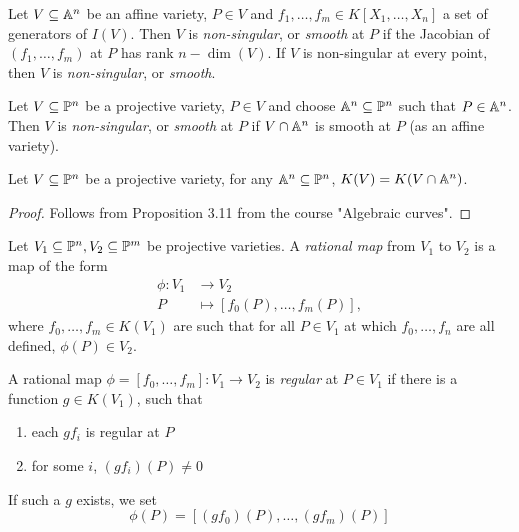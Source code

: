 \begin{definition}
	Let $V \subseteq \mathbb{A}^n$ be an affine variety, $P \in V$ and 
	$f_1, \dots, f_m \in K[X_1, \dots, X_n]$ a set of generators of $I(V)$.
	Then $V$ is \emph{non-singular}, or \emph{smooth} at $P$ if the Jacobian
	of $(f_1, \dots, f_m)$ at $P$ has rank $n - \dim(V)$.
	If $V$ is non-singular at every point, then $V$ is \emph{non-singular},
	or \emph{smooth}.
\end{definition}

\begin{definition}
	Let $V \subseteq \mathbb{P}^n$ be a projective variety,
	$P \in V$ and choose $\mathbb{A}^n \subseteq \mathbb{P}^n$ such
	that $P \in \mathbb{A}^n$. Then $V$ is \emph{non-singular}, or \emph{smooth}
	at $P$ if $V \cap \mathbb{A}^n$ is smooth at $P$ (as an affine variety).
\end{definition}

\begin{proposition}
	Let $V \subseteq \mathbb{P}^n$ be a projective variety,
	for any $\mathbb{A}^n \subseteq \mathbb{P}^n$, $K(V) = K(V\cap \mathbb{A}^n)$.
\end{proposition}

\begin{proof}
	Follows from Proposition 3.11 from the course "Algebraic curves".
\end{proof}

\begin{definition}
	Let $V_1 \subseteq \mathbb{P}^n, V_2 \subseteq \mathbb{P}^m$ be projective varieties.
	A \emph{rational map} from $V_1$ to $V_2$ is a map of the form
	\begin{align*}
		\phi: V_1 &\to V_2\\
		P &\mapsto [f_0(P), \dots, f_m(P)],
	\end{align*}
	where $f_0, \dots, f_m \in K(V_1)$ are such that
	for all $P \in V_1$ at which $f_0, \dots, f_n$ are all defined, 
	$\phi(P) \in V_2$.
\end{definition}

\begin{definition}
	A rational map $\phi = [f_0, \dots, f_m]: V_1 \to V_2$
	is \emph{regular} at $P \in V_1$ if there is a function $g \in K(V_1)$,
	such that
	\begin{enumerate}[label=(\roman*)]
		\item each $gf_i$ is regular at $P$
		\item for some $i$, $(gf_i)(P) \neq 0$
	\end{enumerate}
	If such a $g$ exists, we set
	\begin{equation*}
		\phi(P) = [(gf_0)(P), \dots, (gf_m)(P)]
	\end{equation*}
\end{definition}

